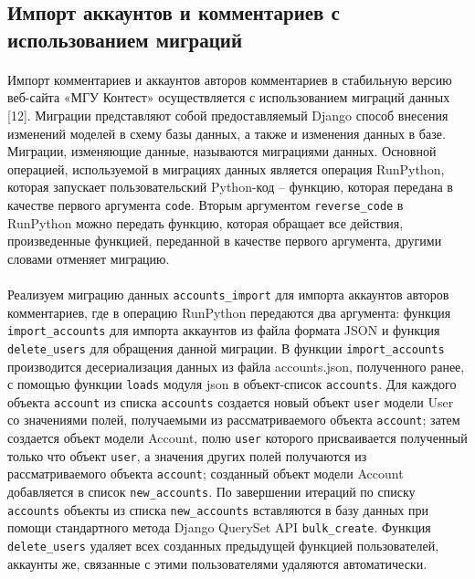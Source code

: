\documentclass[12pt, a4paper, oneside]{article}
\begin{document}
\subsection{Импорт аккаунтов и комментариев с использованием миграций}
\paragraph{}
Импорт комментариев и аккаунтов авторов комментариев в стабильную версию веб-сайта «МГУ Контест» осуществляется с использованием миграций данных [12]. Миграции представляют собой предоставляемый Django способ внесения изменений моделей в схему базы данных, а также и изменения данных в базе. Миграции, изменяющие данные, называются миграциями данных. Основной операцией, используемой в миграциях данных является операция RunPython, которая запускает пользовательский Python-код – функцию, которая передана в качестве первого аргумента \texttt{code}. Вторым аргументом \texttt{reverse\_code} в RunPython можно передать функцию, которая обращает все действия, произведенные функцией, переданной в качестве первого аргумента, другими словами отменяет миграцию.
\paragraph{}
Реализуем миграцию данных \texttt{accounts\_import} для импорта аккаунтов авторов комментариев, где в операцию RunPython передаются два аргумента: функция \texttt{import\_accounts} для импорта аккаунтов из файла формата JSON и функция \texttt{delete\_users} для обращения данной миграции. В функции \texttt{import\_accounts} производится десериализация данных из файла accounts.json, полученного ранее, с помощью функции \texttt{loads} модуля json в объект-список \texttt{accounts}. Для каждого объекта \texttt{account} из списка \texttt{accounts} создается новый объект \texttt{user} модели User со значениями полей, получаемыми из рассматриваемого объекта \texttt{account}; затем создается объект модели Account, полю \texttt{user} которого присваивается полученный только что объект \texttt{user}, а значения других полей получаются из рассматриваемого объекта \texttt{account}; созданный объект модели Account добавляется в список \texttt{new\_accounts}. По завершении итераций по списку \texttt{accounts} объекты из списка \texttt{new\_accounts} вставляются в базу данных при помощи стандартного метода Django QuerySet API \texttt{bulk\_create}. Функция \texttt{delete\_users} удаляет всех созданных предыдущей функцией пользователей, аккаунты же, связанные с этими пользователями удаляются автоматически.
\end{document}
